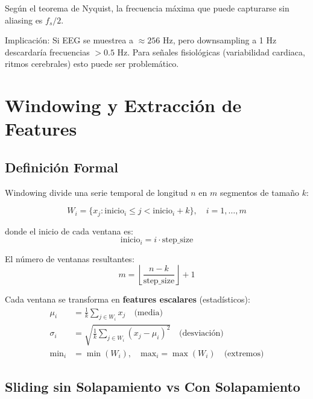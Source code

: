 \documentclass[11pt,twoside,a4paper]{article}
\begin{document}
Según el teorema de Nyquist, la frecuencia máxima que puede capturarse sin aliasing es $f_s / 2$.

Implicación: Si EEG se muestrea a $\approx 256$ Hz, pero downsampling a 1 Hz descardaría frecuencias $> 0.5$ Hz. Para señales fisiológicas (variabilidad cardiaca, ritmos cerebrales) esto puede ser problemático.

\section{Windowing y Extracción de Features}

\subsection{Definición Formal}

Windowing divide una serie temporal de longitud $n$ en $m$ segmentos de tamaño $k$:

\begin{equation}
W_i = \{x_j : \text{inicio}_i \leq j < \text{inicio}_i + k\}, \quad i = 1, \ldots, m
\end{equation}

donde el inicio de cada ventana es:
\begin{equation}
\text{inicio}_i = i \cdot \text{step\_size}
\end{equation}

El número de ventanas resultantes:
\begin{equation}
m = \left\lfloor \frac{n - k}{\text{step\_size}} \right\rfloor + 1
\end{equation}

Cada ventana se transforma en \textbf{features escalares} (estadísticos):
\begin{align}
\mu_i &= \frac{1}{k} \sum_{j \in W_i} x_j \quad \text{(media)} \\
\sigma_i &= \sqrt{\frac{1}{k} \sum_{j \in W_i} (x_j - \mu_i)^2} \quad \text{(desviación)} \\
\text{min}_i &= \min(W_i), \quad \text{max}_i = \max(W_i) \quad \text{(extremos)}
\end{align}

\subsection{Sliding sin Solapamiento vs Con Solapamiento}
\end{document}
